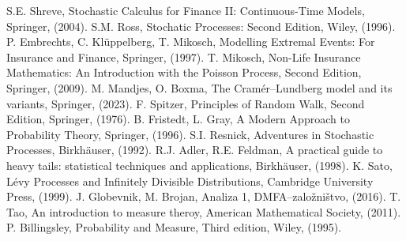 \documentclass[12pt, a4paper, reqno]{amsart}
\theoremstyle{definition}
\theoremstyle{plain}
\newcommand{\1}{\mathds{1}}
\begin{document}
\begin{thebibliography}{99}
S.E. Shreve, Stochastic Calculus for Finance II: Continuous-Time Models, Springer, (2004).
S.M. Ross, Stochatic Processes: Second Edition, Wiley, (1996).
P. Embrechts, C. Klüppelberg, T. Mikosch, Modelling Extremal Events: For Insurance and Finance, Springer, (1997).
T. Mikosch, Non-Life Insurance Mathematics: An Introduction with the Poisson Process, Second Edition, Springer, (2009).
M. Mandjes, O. Boxma, The Cramér--Lundberg model and its variants, Springer, (2023).
F. Spitzer, Principles of Random Walk, Second Edition, Springer, (1976).
B. Fristedt, L. Gray, A Modern Approach to Probability Theory, Springer, (1996).
S.I. Resnick, Adventures in Stochastic Processes, Birkhäuser, (1992).
R.J. Adler, R.E. Feldman, A practical guide to heavy tails: statistical techniques and applications, Birkhäuser, (1998).
K. Sato, Lévy Processes and Infinitely Divisible Distributions, Cambridge University Press, (1999).
J. Globevnik, M. Brojan, Analiza 1, DMFA--založništvo, (2016).
T. Tao, An introduction to measure theroy, American Mathematical Society, (2011).
P. Billingsley, Probability and Measure, Third edition, Wiley, (1995).
\end{thebibliography}
\end{document}
